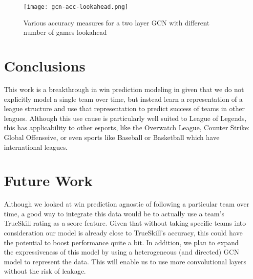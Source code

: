 \documentclass{article}
\begin{document}
\begin{figure}[h!]
    \centering
    \texttt{[image: gcn-acc-lookahead.png]}
    \caption{Various accuracy measures for a two layer GCN with different number of games lookahead}
    \label{fig:lookahead}
\end{figure}


\section{Conclusions}

This work is a breakthrough in win prediction modeling in given that we do not explicitly model a single team over time, but instead learn a representation of a league structure and use that representation to predict success of teams in other leagues. 
Although this use cause is particularly well suited to League of Legends, this has applicability to other esports, like the Overwatch League, Counter Strike: Global Offenseive, or even sports like Baseball or Basketball which have international leagues.

\section{Future Work}

Although we looked at win prediction agnostic of following a particular team over time, a good way to integrate this data would be to actually use a team's TrueSkill rating as a score feature.
Given that without taking specific teams into consideration our model is already close to TrueSkill's accuracy, this could have the potential to boost performance quite a bit. 
In addition, we plan to expand the expressiveness of this model by using a heterogeneous (and directed) GCN model to represent the data. 
This will enable us to use more convolutional layers without the risk of leakage.


\iffalse
Our original goal was to incorporate word embeddings into a deep model of both each player and each champion.
In this way, the hope was that we would be able to get an above $50\%$ accuracy in prediction of the game outcome before the game even started!

Insofar, this method has been too difficult to train, hovering around the $50\%$ mark, essentially learning nothing.
Inexperience with word embeddings is likely a contributor, however we have tried training both in parallel with the deep model and independent of the model.  
Nothing has been fruitful as of yet.
Our intentions are to try to continue with this deep method.
A possible suggestion we have received is to handcraft the embeddings ourselves to be able to apply the deep model.
From there, we can further tweak to see if we can get a model to generate embeddings of its own.
This is our most likely course of action.
\fi


\printbibliography
\end{document}
